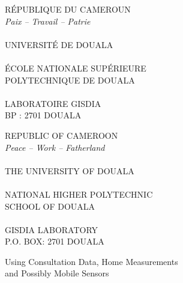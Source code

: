 \begin{titlepage}
\singlespacing
\color{tpNavy}
\noindent\begin{minipage}[t]{0.44\textwidth}\centering
{}
\end{minipage}\hfill
\begin{minipage}[t]{0.44\textwidth}\centering
{}
\end{minipage}

\vspace{0.25cm}
{\scriptsize\bfseries
\noindent\begin{minipage}[t]{0.44\textwidth}\centering
RÉPUBLIQUE DU CAMEROUN\\ {\mdseries\itshape Paix -- Travail -- Patrie}\\ \tpsep\\
UNIVERSITÉ DE DOUALA\\ \tpsep\\
ÉCOLE NATIONALE SUPÉRIEURE\\ POLYTECHNIQUE DE DOUALA\\ \tpsep\\
LABORATOIRE GISDIA\\ BP : 2701 DOUALA
\end{minipage}\hfill
\begin{minipage}[t]{0.44\textwidth}\centering
REPUBLIC OF CAMEROON\\ {\mdseries\itshape Peace -- Work -- Fatherland}\\ \tpsep\\
THE UNIVERSITY OF DOUALA\\ \tpsep\\
NATIONAL HIGHER POLYTECHNIC\\ SCHOOL OF DOUALA\\ \tpsep\\
GISDIA LABORATORY\\ P.O. BOX: 2701 DOUALA
\end{minipage}\par}

\vspace{0.8cm}
\begin{center}
{\setlength{\fboxsep}{9pt}\par}

\vspace{0.6cm}
{\large\color{tpBlue} Using Consultation Data, Home Measurements\\ and Possibly Mobile Sensors\par}


\end{center}
\end{titlepage}
